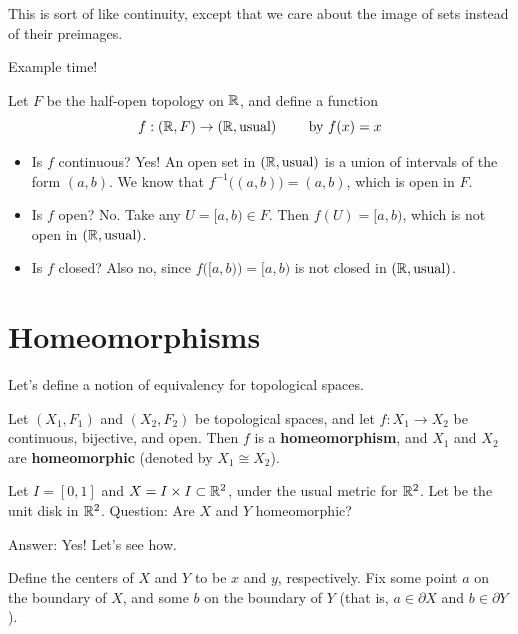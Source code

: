 This is sort of like continuity, except that we care about the image of sets instead of their preimages.

Example time! 
\begin{example}
	Let $F$ be the half-open topology on $\mathbb R$, and define a function
	\[{f:(\mathbb R,F)\to(\mathbb R,\text{usual})}\qquad\text{ by }f(x) = x\]
\end{example}
\begin{itemize}
	\item Is $f$ continuous? Yes! An open set in $(\mathbb R, \text{usual})$ is a union of intervals of the form $(a,b)$. We know that $f^{-1}\big((a,b)\big) = (a,b)$, which is open in $F$. 
	\item Is $f$ open? No. Take any $U = [a,b) \in F$. Then $f(U) = [a,b)$, which is not open in $(\mathbb R, \text{usual})$. 
	\item Is $f$ closed? Also no, since $f\big([a,b)\big) = [a,b)$ is not closed in $(\mathbb R, \text{usual})$. 
\end{itemize}

\section{Homeomorphisms} Let's define a notion of equivalency for topological spaces. 
\begin{definition}
	Let $(X_1,F_1)$ and $(X_2,F_2)$ be topological spaces, and let $f:X_1\to X_2$ be continuous, bijective, and open. Then $f$ is a {\bf homeomorphism}, and $X_1$ and $X_2$ are {\bf homeomorphic} (denoted by $X_1 \cong X_2$). 
\end{definition}
\begin{example}
	Let $I = [0,1]$ and $X = I\times I\subset\mathbb R^2$, under the usual metric for $\mathbb R^2$. Let  be the unit disk in $\mathbb R^2$. Question: Are $X$ and $Y$ homeomorphic? 
	
	Answer: Yes! Let's see how. 
\end{example}

Define the centers of $X$ and $Y$ to be $x$ and $y$, respectively. Fix some point $a$ on the boundary of $X$, and some $b$ on the boundary of $Y$ (that is, $a\in 
\partial X$ and $b\in\partial Y$).


